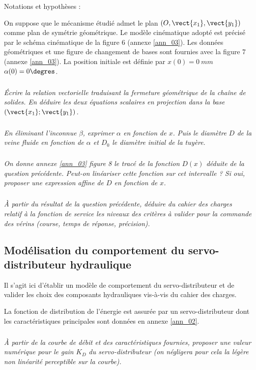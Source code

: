 \documentclass[10pt,fleqn]{article} %
\begin{document}
\noindent Notations et hypothèses :
	
	On suppose que le mécanisme étudié admet le plan  $\left(O,\vect{x_1}, \vect{y_1}\right)$ comme plan de symétrie géométrique.
Le modèle cinématique adopté est précisé par le schéma cinématique de la figure 6 (annexe \ref{ann_03}). 
Les données géométriques et une figure de changement de bases sont fournies avec la figure 7 (annexe \ref{ann_03}). 
La position initiale est définie par $x(0)=\SI{0}{mm}$
$\alpha(0) = 0\degres$.

\subparagraph{}\textit{Écrire la relation vectorielle traduisant la fermeture géométrique de la chaîne de solides. En déduire les deux équations scalaires en projection dans la base  $\left( \vect{x_1};\vect{y_1} \right)$.}

\subparagraph{\label{q_05}}\textit{En éliminant l'inconnue $\beta$, exprimer $\alpha$ en fonction de $x$. Puis le diamètre $D$ de la veine fluide en fonction de $\alpha$ et $D_0$ le diamètre initial de la tuyère.}

\subparagraph{}\textit{On donne annexe \ref{ann_03} figure 8 le tracé de la fonction $D(x)$ déduite de la question précédente. Peut-on linéariser cette fonction sur cet intervalle ? Si oui, proposer une expression affine de $D$ en fonction de $x$. }

\subparagraph{}\textit{À partir du résultat de la question précédente, déduire du cahier des charges relatif à la fonction de service les niveaux des critères à valider pour la commande des vérins (course, temps de réponse, précision).}

\subsection{Modélisation du comportement du servo-distributeur hydraulique}

\begin{obj}
Il s'agit ici d'établir un modèle de comportement du servo-distributeur et de valider les choix des composants hydrauliques vis-à-vis du cahier des charges.
\end{obj}

La fonction de distribution de l'énergie est assurée par un servo-distributeur dont les caractéristiques principales sont données en annexe \ref{ann_02}.
\subparagraph{}\textit{À partir de la courbe de débit et des caractéristiques fournies, proposer une valeur numérique pour le gain $K_D$ du servo-distributeur (on négligera pour cela la légère non linéarité perceptible sur la courbe).   }
\end{document}

